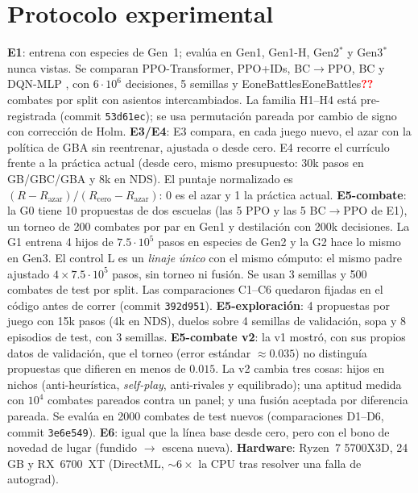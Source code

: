 \documentclass[conference]{IEEEtran}
\newcommand{\val}[1]{\ifcsname #1\endcsname\csname #1\endcsname\else\textbf{\textcolor{red}{??}}\fi}
\begin{document}
\section{Protocolo experimental}
\textbf{E1}: entrena con especies de Gen~1; evalúa en Gen1, Gen1-H, Gen2$^\ast$ y Gen3$^\ast$ nunca vistas. Se comparan PPO-Transformer, PPO+IDs, BC$\to$PPO, BC y DQN-MLP \cite{mnih2015dqn}, con $6\cdot10^6$ decisiones, 5 semillas y \val{EoneBattles} combates por split con asientos intercambiados. La familia H1--H4 está pre-registrada (commit \texttt{53d61ec}); se usa permutación pareada por cambio de signo con corrección de Holm.
\textbf{E3/E4}: E3 compara, en cada juego nuevo, el azar con la política de GBA sin reentrenar, ajustada o desde cero. E4 recorre el currículo frente a la práctica actual (desde cero, mismo presupuesto: 30k pasos en GB/GBC/GBA y 8k en NDS). El puntaje normalizado es $(R-R_{\text{azar}})/(R_{\text{cero}}-R_{\text{azar}})$: 0 es el azar y 1 la práctica actual.
\textbf{E5-combate}: la G0 tiene 10 propuestas de dos escuelas (las 5 PPO y las 5 BC$\to$PPO de E1), un torneo de 200 combates por par en Gen1 y destilación con 200k decisiones. La G1 entrena 4 hijos de $7.5\cdot10^5$ pasos en especies de Gen2 y la G2 hace lo mismo en Gen3. El control L es un \emph{linaje único} con el mismo cómputo: el mismo padre ajustado $4\times7.5\cdot10^5$ pasos, sin torneo ni fusión. Se usan 3 semillas y 500 combates de test por split. Las comparaciones C1--C6 quedaron fijadas en el código antes de correr (commit \texttt{392d951}).
\textbf{E5-exploración}: 4 propuestas por juego con 15k pasos (4k en NDS), duelos sobre 4 semillas de validación, sopa y 8 episodios de test, con 3 semillas.
\textbf{E5-combate v2}: la v1 mostró, con sus propios datos de validación, que el torneo (error estándar ${\approx}0.035$) no distinguía propuestas que difieren en menos de $0.015$. La v2 cambia tres cosas: hijos en nichos (anti-heurística, \emph{self-play}, anti-rivales y equilibrado); una aptitud medida con $10^4$ combates pareados contra un panel; y una fusión aceptada por diferencia pareada. Se evalúa en 2000 combates de test nuevos (comparaciones D1--D6, commit \texttt{3e6e549}).
\textbf{E6}: igual que la línea base desde cero, pero con el bono de novedad de lugar (fundido $\to$ escena nueva).
\textbf{Hardware}: Ryzen~7 5700X3D, 24\,GB y RX~6700~XT (DirectML, ${\sim}6\times$ la CPU tras resolver una falla de autograd).
\end{document}
